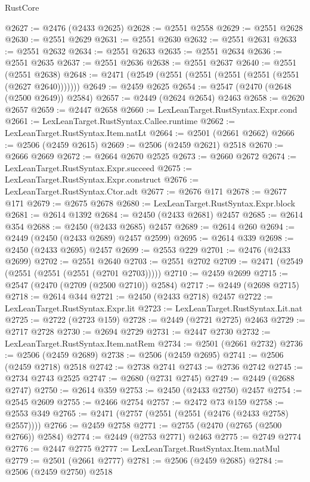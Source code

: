 \begin{lexlean}{RustCore}
\begin{coremodule}
@2627 := @2476 (@2433 @2625)
@2628 := @2551 @2558
@2629 := @2551 @2628
@2630 := @2551 @2629
@2631 := @2551 @2630
@2632 := @2551 @2631
@2633 := @2551 @2632
@2634 := @2551 @2633
@2635 := @2551 @2634
@2636 := @2551 @2635
@2637 := @2551 @2636
@2638 := @2551 @2637
@2640 := @2551 (@2551 @2638)
@2648 := @2471 (@2549 (@2551 (@2551 (@2551 (@2551 (@2551 (@2627 @2640)))))))
@2649 := @2459 @2625
@2654 := @2547 (@2470 (@2648 (@2500 @2649)) @2584)
@2657 := @2449 (@2624 @2654) @2463
@2658 := @2620 @2657
@2659 := @2447 @2658
@2660 := LexLeanTarget.RustSyntax.Expr.cond
@2661 := LexLeanTarget.RustSyntax.Callee.runtime
@2662 := LexLeanTarget.RustSyntax.Item.natLt
@2664 := @2501 (@2661 @2662)
@2666 := @2506 (@2459 @2615)
@2669 := @2506 (@2459 @2621) @2518
@2670 := @2666 @2669
@2672 := @2664 @2670 @2525
@2673 := @2660 @2672
@2674 := LexLeanTarget.RustSyntax.Expr.succeed
@2675 := LexLeanTarget.RustSyntax.Expr.construct
@2676 := LexLeanTarget.RustSyntax.Ctor.adt
@2677 := @2676 @171
@2678 := @2677 @171
@2679 := @2675 @2678
@2680 := LexLeanTarget.RustSyntax.Expr.block
@2681 := @2614 @1392
@2684 := @2450 (@2433 @2681) @2457
@2685 := @2614 @354
@2688 := @2450 (@2433 @2685) @2457
@2689 := @2614 @260
@2694 := @2449 (@2450 (@2433 @2689) @2457 @2599)
@2695 := @2614 @339
@2698 := @2450 (@2433 @2695) @2457
@2699 := @2553 @229
@2701 := @2476 (@2433 @2699)
@2702 := @2551 @2640
@2703 := @2551 @2702
@2709 := @2471 (@2549 (@2551 (@2551 (@2551 (@2701 @2703)))))
@2710 := @2459 @2699
@2715 := @2547 (@2470 (@2709 (@2500 @2710)) @2584)
@2717 := @2449 (@2698 @2715)
@2718 := @2614 @344
@2721 := @2450 (@2433 @2718) @2457
@2722 := LexLeanTarget.RustSyntax.Expr.lit
@2723 := LexLeanTarget.RustSyntax.Lit.nat
@2725 := @2722 (@2723 @159)
@2728 := @2449 (@2721 @2725) @2463
@2729 := @2717 @2728
@2730 := @2694 @2729
@2731 := @2447 @2730
@2732 := LexLeanTarget.RustSyntax.Item.natRem
@2734 := @2501 (@2661 @2732)
@2736 := @2506 (@2459 @2689)
@2738 := @2506 (@2459 @2695)
@2741 := @2506 (@2459 @2718) @2518
@2742 := @2738 @2741
@2743 := @2736 @2742
@2745 := @2734 @2743 @2525
@2747 := @2680 (@2731 @2745)
@2749 := @2449 (@2688 @2747)
@2750 := @2614 @359
@2753 := @2450 (@2433 @2750) @2457
@2754 := @2545 @2609
@2755 := @2466 @2754
@2757 := @2472 @73 @159
@2758 := @2553 @349
@2765 := @2471 (@2757 (@2551 (@2551 (@2476 (@2433 @2758) @2557))))
@2766 := @2459 @2758
@2771 := @2755 (@2470 (@2765 (@2500 @2766)) @2584)
@2774 := @2449 (@2753 @2771) @2463
@2775 := @2749 @2774
@2776 := @2447 @2775
@2777 := LexLeanTarget.RustSyntax.Item.natMul
@2779 := @2501 (@2661 @2777)
@2781 := @2506 (@2459 @2685)
@2784 := @2506 (@2459 @2750) @2518

\end{coremodule}
\end{lexlean}
